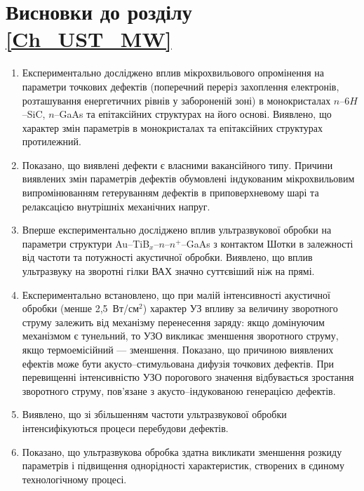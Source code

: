 \documentclass[a4paper,14pt,oneside,openany]{memoir}
\begin{document}
\section*{Висновки до розділу \ref{Ch_UST_MW}}
  \begin{enumerate}
\item Експериментально досліджено вплив мікрохвильового опромінення на параметри точкових дефектів (поперечний переріз захоплення електронів,
розташування енергетичних рівнів у забороненій зоні) в монокристалах $n$--6$H$--SiC, $n$--GaAs та епітаксійних структурах на його основі.
Виявлено, що характер змін параметрів в монокристалах та епітаксійних структурах протилежний.

\item Показано, що виявлені дефекти є власними вакансійного типу.
Причини виявлених змін параметрів дефектів обумовлені індукованим мікрохвильовим випромінюванням гетеруванням дефектів в приповерхневому шарі та релаксацією внутрішніх механічних напруг.

     \item Вперше експериментально досліджено вплив ультразвукової обробки на параметри структури Au--TiB$_x$--$n$--$n^+$--GaAs з контактом Шотки
 в залежності від частоти та потужності акустичної обробки.
Виявлено, що вплив ультразвуку на зворотні гілки ВАХ значно суттєвіший ніж на прямі.

\item Експериментально встановлено, що при малій інтенсивності акустичної обробки (менше 2,5~Вт/см$^2$) характер УЗ впливу за величину зворотного струму залежить від механізму перенесення заряду:
  якщо домінуючим механізмом є тунельний, то УЗО викликає зменшення зворотного струму, якщо термоемісійний --- зменшення.
  Показано, що причиною виявлених ефектів може бути акусто--стимульована дифузія точкових дефектів.
  При перевищенні інтенсивністю УЗО порогового значення відбувається зростання зворотного струму, пов'язане з акусто--індукованою генерацією дефектів.

\item Виявлено, що зі збільшенням частоти ультразвукової обробки інтенсифікуються процеси перебудови дефектів.

\item Показано, що ультразвукова обробка здатна викликати зменшення розкиду параметрів і підвищення однорідності характеристик, створених в єдиному технологічному процесі.
 \end{enumerate}	
\end{document}
